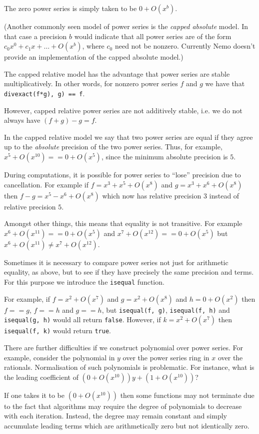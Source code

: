 \documentclass[a4paper,10pt]{article}
\newcommand{\code}{\lstinline}
\begin{document}
The zero power series is simply taken to be $0 + O(x^b)$.

(Another commonly seen model of power series is the \emph{capped absolute}
model. In that case a precision $b$ would indicate that all power series are
of the form $c_0x^0 + c_1x + \ldots + O(x^b)$, where $c_0$ need not be
nonzero. Currently Nemo doesn't provide an implementation of the capped
absolute model.)

The capped relative model has the advantage that power series are stable
multiplicatively. In other words, for nonzero power series $f$ and $g$ we
have that \code{divexact(f*g), g) == f}.

However, capped relative power series are not additively stable, i.e. we
do not always have $(f + g) - g = f$.

In the capped relative model we say that two power series are equal if they
agree up to the \emph{absolute} precision of the two power series. Thus, for
example, $x^5 + O(x^10) == 0 + O(x^5)$, since the minimum absolute precision
is $5$.

During computations, it is possible for power series to ``lose'' precision
due to cancellation. For example if $f = x^3 + x^5 + O(x^8)$ and
$g = x^3 + x^6 + O(x^8)$ then $f - g = x^5 - x^6 + O(x^8)$ which now has
relative precision $3$ instead of relative precision $5$.

Amongst other things, this means that equality is not transitive. For example
$x^6 + O(x^11) == 0 + O(x^5)$ and $x^7 + O(x^12) == 0 + O(x^5)$ but
$x^6 + O(x^11) \neq x^7 + O(x^12)$.

Sometimes it is necessary to compare power series not just for arithmetic
equality, as above, but to see if they have precisely the same precision and
terms. For this purpose we introduce the \code{isequal} function.

For example, if $f = x^2 + O(x^7)$ and $g = x^2 + O(x^8)$ and $h = 0 + O(x^2)$
then $f == g$, $f == h$ and $g == h$, but \code{isequal(f, g)},
\code{isequal(f, h)} and \code{isequal(g, h)} would all return \code{false}.
However, if $k = x^2 + O(x^7)$ then \code{isequal(f, k)} would return
\code{true}.

There are further difficulties if we construct polynomial over power series.
For example, consider the polynomial in $y$ over the power series ring in $x$
over the rationals. Normalisation of such polynomials is problematic. For
instance, what is the leading coefficient of $(0 + O(x^10))y + (1 + O(x^10))$?

If one takes it to be $(0 + O(x^10))$ then some functions may not terminate
due to the fact that algorithms may require the degree of polynomials to
decrease with each iteration. Instead, the degree may remain constant and
simply accumulate leading terms which are arithmetically zero but not
identically zero.
\end{document}
